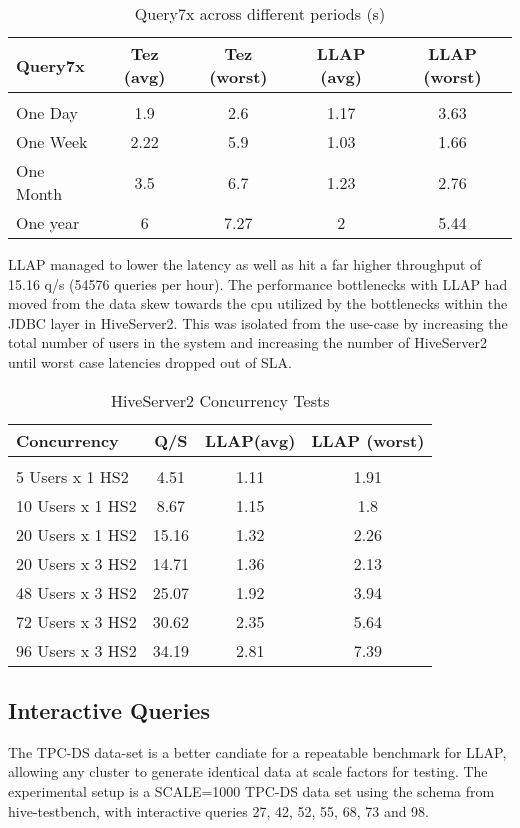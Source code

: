 \begin{table}[h]
\begin{tabular}{l|*{4}c}
Query7x  &   Tez (avg)  &   Tez (worst)  &   LLAP (avg)  &   LLAP (worst) \\
\hline \\
One Day  &   1.9  &   2.6  &   1.17  &   3.63 \\
One Week  &   2.22  &   5.9  &   1.03  &   1.66 \\
One Month  &   3.5  &   6.7  &   1.23  &   2.76 \\
One year  &   6  &   7.27  &   2  &   5.44 \\
\end{tabular}
\caption{Query7x across different periods (s)}
\end{table}

LLAP managed to lower the latency as well as hit a far higher throughput of 15.16 q/s (54576 queries per hour). The 
performance bottlenecks with LLAP had moved from the data skew towards the cpu utilized by the bottlenecks within
the JDBC layer in HiveServer2. This was isolated from the use-case by increasing the total number of users in the system and
increasing the number of HiveServer2 until worst case latencies dropped out of SLA.

\begin{table}[h]
\begin{tabular}{l|*{3}c}
Concurrency & Q/S & LLAP(avg) & LLAP (worst) \\
\hline \\
5 Users x 1 HS2 & 4.51 & 1.11 & 1.91 \\
10 Users x 1 HS2 & 8.67 & 1.15 & 1.8 \\
20 Users x 1 HS2 & 15.16 & 1.32 & 2.26 \\
20 Users x 3 HS2 & 14.71 & 1.36 & 2.13 \\
48 Users x 3 HS2 & 25.07 & 1.92 & 3.94 \\
72 Users x 3 HS2 & 30.62 & 2.35 & 5.64 \\
96 Users x 3 HS2 & 34.19 & 2.81 & 7.39 \\
\end{tabular}
\caption{HiveServer2 Concurrency Tests}
\end{table}

\subsection{Interactive Queries}

The TPC-DS data-set is a better candiate for a repeatable benchmark for LLAP, allowing any cluster to generate
identical data at scale factors for testing. The experimental setup is a SCALE=1000 TPC-DS data set using the 
schema from hive-testbench\cite{testbench}, with interactive queries 
27, 42, 52, 55, 68, 73 and 98.

